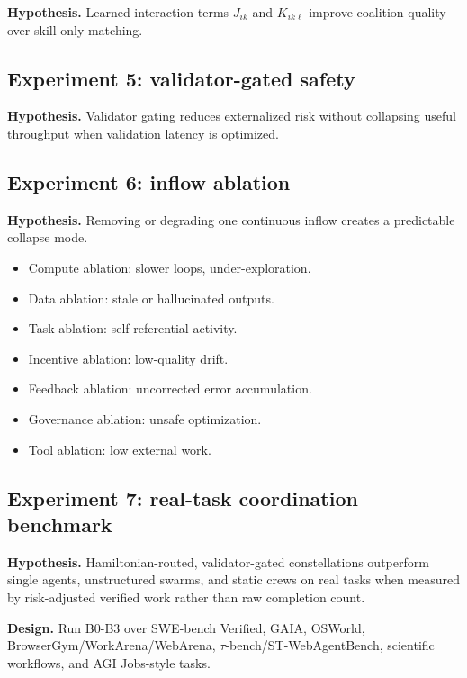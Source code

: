 \documentclass[11pt]{article}
\providecommand{\tightlist}{\setlength{\itemsep}{0pt}\setlength{\parskip}{0pt}}
\begin{document}
\textbf{Hypothesis.} Learned interaction terms \(J_{ik}\) and
\(K_{ik\ell}\) improve coalition quality over skill-only matching.

\subsection{Experiment 5: validator-gated
safety}\label{experiment-5-validator-gated-safety}

\textbf{Hypothesis.} Validator gating reduces externalized risk without
collapsing useful throughput when validation latency is optimized.

\subsection{Experiment 6: inflow
ablation}\label{experiment-6-inflow-ablation}

\textbf{Hypothesis.} Removing or degrading one continuous inflow creates
a predictable collapse mode.

\begin{itemize}
\tightlist
\item
  Compute ablation: slower loops, under-exploration.
\item
  Data ablation: stale or hallucinated outputs.
\item
  Task ablation: self-referential activity.
\item
  Incentive ablation: low-quality drift.
\item
  Feedback ablation: uncorrected error accumulation.
\item
  Governance ablation: unsafe optimization.
\item
  Tool ablation: low external work.
\end{itemize}

\subsection{Experiment 7: real-task coordination
benchmark}\label{experiment-7-real-task-coordination-benchmark}

\textbf{Hypothesis.} Hamiltonian-routed, validator-gated constellations
outperform single agents, unstructured swarms, and static crews on real
tasks when measured by risk-adjusted verified work rather than raw
completion count.

\textbf{Design.} Run B0-B3 over SWE-bench Verified, GAIA, OSWorld,
BrowserGym/WorkArena/WebArena, \(\tau\)-bench/ST-WebAgentBench,
scientific workflows, and AGI Jobs-style tasks.
\end{document}
